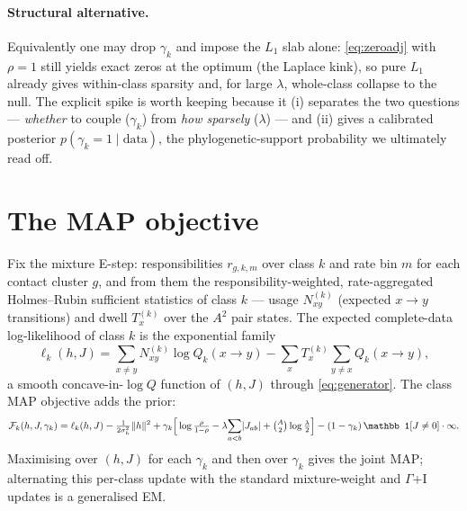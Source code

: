 \documentclass[11pt]{article}
\begin{document}
\paragraph{Structural alternative.} Equivalently one may drop $\gamma_k$ and impose the
$L_1$ slab alone: \eqref{eq:zeroadj} with $\rho{=}1$ still yields exact zeros at the
optimum (the Laplace kink), so pure $L_1$ already gives within-class sparsity and, for
large $\lambda$, whole-class collapse to the null. The explicit spike is worth keeping
because it (i) separates the two questions --- \emph{whether} to couple ($\gamma_k$) from
\emph{how sparsely} ($\lambda$) --- and (ii) gives a calibrated posterior
$p(\gamma_k{=}1\mid\text{data})$, the phylogenetic-support probability we ultimately read
off.

\section{The MAP objective}
\label{sec:objective}

Fix the mixture E-step: responsibilities $r_{g,k,m}$ over class $k$ and rate bin $m$ for
each contact cluster $g$, and from them the responsibility-weighted, rate-aggregated
Holmes--Rubin sufficient statistics of class $k$ --- usage $N^{(k)}_{xy}$ (expected
$x\!\to\!y$ transitions) and dwell $T^{(k)}_x$ over the $A^2$ pair states. The expected
complete-data log-likelihood of class $k$ is the exponential family
\begin{equation}
\label{eq:ell}
\ell_k(h,J)=\sum_{x\ne y}N^{(k)}_{xy}\log Q_k(x\!\to\!y)
   -\sum_x T^{(k)}_x\!\!\sum_{y\ne x}\!Q_k(x\!\to\!y),
\end{equation}
a smooth concave-in-$\log Q$ function of $(h,J)$ through
\eqref{eq:generator}. The class MAP objective adds the prior:
\begin{equation}
\label{eq:map}
\mathcal F_k(h,J,\gamma_k)=\ell_k(h,J)-\tfrac{1}{2\sigma_h^2}\|h\|^2
   +\gamma_k\Big[\log\tfrac{\rho}{1-\rho}
   -\lambda\!\sum_{a<b}\!|J_{ab}|+\tbinom{A}{2}\log\tfrac{\lambda}{2}\Big]
   -(1-\gamma_k)\,\mathbb 1[J\ne0]\cdot\infty .
\end{equation}
Maximising over $(h,J)$ for each $\gamma_k$ and then over $\gamma_k$ gives the joint MAP;
alternating this per-class update with the standard mixture-weight and $\Gamma$+I updates
is a generalised EM.
\end{document}
